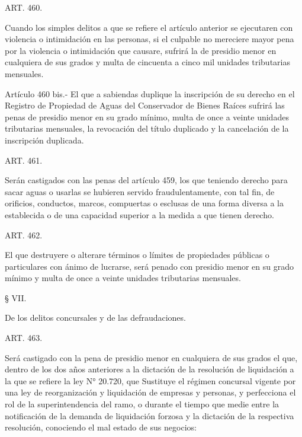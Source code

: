     ART. 460.

    Cuando los simples delitos a que se refiere el artículo anterior se ejecutaren con violencia o intimidación en las personas, si el culpable no mereciere mayor pena por la violencia o intimidación que causare, sufrirá la de presidio menor en cualquiera de sus grados y multa de cincuenta a cinco mil unidades tributarias mensuales.









    Artículo 460 bis.- El que a sabiendas duplique la inscripción de su derecho en el Registro de Propiedad de Aguas del Conservador de Bienes Raíces sufrirá las penas de presidio menor en su grado mínimo, multa de once a veinte unidades tributarias mensuales, la revocación del título duplicado y la cancelación de la inscripción duplicada.



    ART. 461.

    Serán castigados con las penas del artículo 459, los que teniendo derecho para sacar aguas o usarlas se hubieren servido fraudulentamente, con tal fin, de orificios, conductos, marcos, compuertas o esclusas de una forma diversa a la establecida o de una capacidad superior a la medida a que tienen derecho.


    ART. 462.

    El que destruyere o alterare términos o límites de propiedades públicas o particulares con ánimo de lucrarse, será penado con presidio menor en su grado mínimo y multa de once a veinte unidades tributarias mensuales.








    § VII.

    De los delitos concursales y de las defraudaciones.



    ART. 463.

    Será castigado con la pena de presidio menor en cualquiera de sus grados el que, dentro de los dos años anteriores a la dictación de la resolución de liquidación a la que se refiere la ley N° 20.720, que Sustituye el régimen concursal vigente por una ley de reorganización y liquidación de empresas y personas, y perfecciona el rol de la superintendencia del ramo, o durante el tiempo que medie entre la notificación de la demanda de liquidación forzosa y la dictación de la respectiva resolución, conociendo el mal estado de sus negocios:

